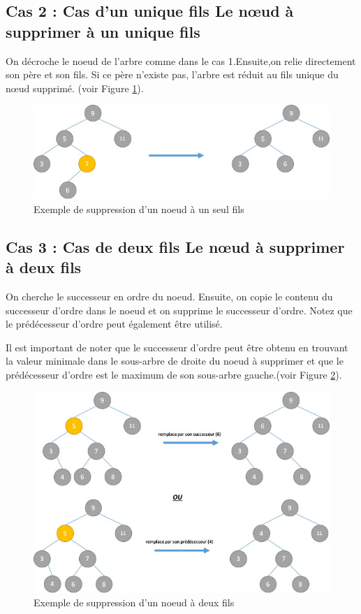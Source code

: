 \subsection{Cas 2 : Cas d’un unique fils Le nœud à supprimer à un unique fils}
On décroche le noeud de l’arbre comme dans le cas 1.Ensuite,on relie directement son père et son fils. Si ce père n’existe pas, l’arbre est réduit au fils unique du nœud supprimé.  (voir Figure \ref{fig:d2}).
\begin{figure}[H]
    \centering
        \includegraphics[scale=0.7]{./ressources/d2.jpeg}
        \caption{Exemple de suppression d'un noeud à un seul fils}
    \label{fig:d2}
\end{figure}

\subsection{Cas 3 : Cas de deux fils Le nœud à supprimer à deux fils}
On cherche le successeur en ordre du noeud. Ensuite, on copie le contenu du successeur d'ordre dans le noeud et on supprime le successeur d'ordre. Notez que le prédécesseur d'ordre peut également être utilisé.
\par
Il est important de noter que le successeur d'ordre peut être obtenu en trouvant la valeur minimale dans le sous-arbre de droite du noeud à supprimer et que le prédécesseur d'ordre est le maximum de son sous-arbre gauche.(voir Figure \ref{fig:d3}).
\begin{figure}[H]
    \centering
        \includegraphics[scale=0.6]{./ressources/d3.jpeg}
        \caption{Exemple de suppression d'un noeud à deux fils}
    \label{fig:d3}
\end{figure}
\par


